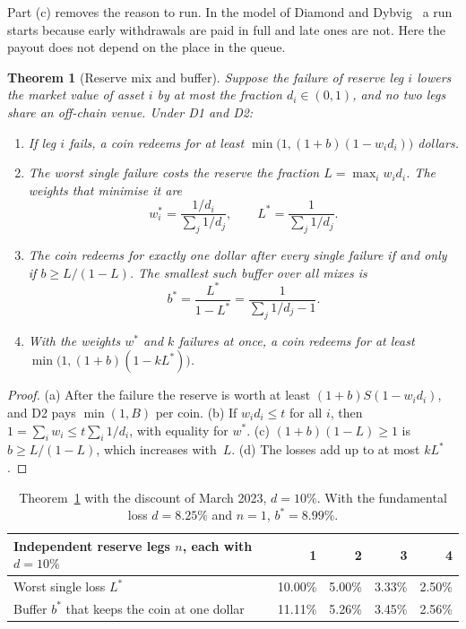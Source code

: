 \documentclass[11pt]{article}
\newtheorem{theorem}{Theorem}
\theoremstyle{definition}
\theoremstyle{remark}
\begin{document}
Part (c) removes the reason to run. In the model of Diamond and Dybvig~\cite{DD} a run starts because early withdrawals are paid in full and late ones are not. Here the payout does not depend on the place in the queue.

\begin{theorem}[Reserve mix and buffer]\label{thm:mix}
Suppose the failure of reserve leg $i$ lowers the market value of asset $i$ by at most the fraction $d_i\in(0,1)$, and no two legs share an off-chain venue. Under \textup{D1} and \textup{D2}:
\begin{enumerate}[label=\textup{(\alph*)}]
\item If leg $i$ fails, a coin redeems for at least $\min\bigl(1,(1+b)(1-w_id_i)\bigr)$ dollars.
\item The worst single failure costs the reserve the fraction $L=\max_iw_id_i$. The weights that minimise it are
\[
  w_i^*=\frac{1/d_i}{\sum_j1/d_j},\qquad L^*=\frac{1}{\sum_j1/d_j}.
\]
\item The coin redeems for exactly one dollar after every single failure if and only if $b\ge L/(1-L)$. The smallest such buffer over all mixes is
\[
  b^*=\frac{L^*}{1-L^*}=\frac{1}{\sum_j1/d_j-1}.
\]
\item With the weights $w^*$ and $k$ failures at once, a coin redeems for at least $\min\bigl(1,(1+b)(1-kL^*)\bigr)$.
\end{enumerate}
\end{theorem}

\begin{proof}
(a) After the failure the reserve is worth at least $(1+b)S(1-w_id_i)$, and D2 pays $\min(1,B)$ per coin. (b) If $w_id_i\le t$ for all $i$, then $1=\sum_iw_i\le t\sum_i1/d_i$, with equality for $w^*$. (c) $(1+b)(1-L)\ge1$ is $b\ge L/(1-L)$, which increases with~$L$. (d) The losses add up to at most $kL^*$.
\end{proof}

\begin{table}[h]
\centering\small
\begin{tabular}{@{}lrrrr@{}}
\toprule
Independent reserve legs $n$, each with $d=10\%$ & 1 & 2 & 3 & 4\\
\midrule
Worst single loss $L^*$ & 10.00\% & 5.00\% & 3.33\% & 2.50\%\\
Buffer $b^*$ that keeps the coin at one dollar & 11.11\% & 5.26\% & 3.45\% & 2.56\%\\
\bottomrule
\end{tabular}
\caption{Theorem~\ref{thm:mix} with the discount of March 2023, $d=10\%$. With the fundamental loss $d=8.25\%$ and $n=1$, $b^*=8.99\%$.}
\label{tab:mix}
\end{table}
\end{document}
